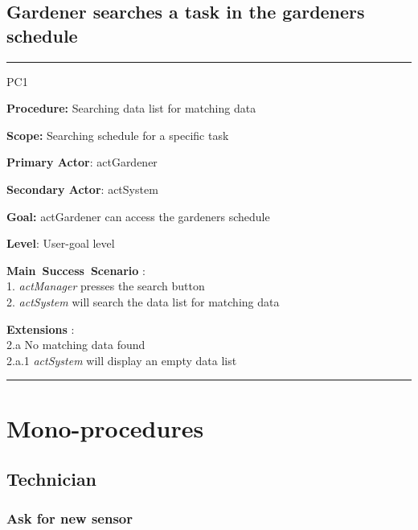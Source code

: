 \break

\subsection{Gardener searches a task in the gardeners schedule}
\vspace{0.5cm}
\hrule
\hfill \break
\begin{lyxlist}{PC1}
\small{
\item [\textbf{Procedure:}] Searching data list for matching data
\item [\textbf{Scope:}] Searching schedule for a specific task
\item [\textbf{Primary Actor}:] actGardener
\item [\textbf{Secondary Actor}:] actSystem
\item [\textbf{Goal:}] actGardener can access the gardeners schedule
\item [\textbf{Level}:] User-goal level
\item [\textbf{Main~Success~Scenario}]:\\
1. \emph{actManager} presses the search button\\
2. \emph{actSystem} will search the data list for matching data\\
\item [\textbf{Extensions}]:\\
2.a No matching data found\\
\hspace*{0.5cm} 2.a.1 \emph{actSystem} will display an empty data list}
\end{lyxlist}
\hrule
\vspace{0.5cm}



\break



\section{Mono-procedures}



\subsection{Technician}

\subsubsection{Ask for new sensor}

